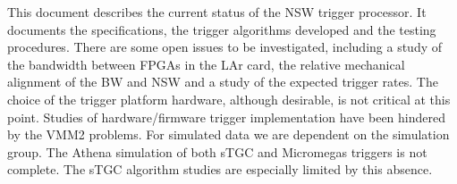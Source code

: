 This document describes the current status of the NSW trigger
processor. It documents the specifications, the trigger algorithms
developed and the testing procedures. There are some open issues to be
investigated, including a study of the bandwidth between FPGAs in the
LAr card, the relative mechanical alignment of the BW and NSW and a study of the
expected trigger rates. The choice of the trigger platform hardware, although desirable, is not critical at this point. Studies of hardware/firmware trigger implementation have been hindered by the VMM2 problems.
For simulated data we are dependent on the simulation group.
The Athena simulation of both sTGC and Micromegas triggers is not complete.
The sTGC algorithm studies are especially limited by this absence.



%
%
%
%
